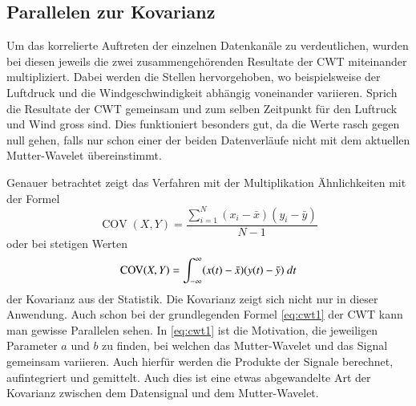 \begin{refsection}
\subsection{Parallelen zur Kovarianz}
Um das korrelierte Auftreten der einzelnen Datenkanäle zu verdeutlichen, wurden bei diesen jeweils die zwei zusammengehörenden Resultate der CWT miteinander multipliziert. 
Dabei werden die Stellen hervorgehoben, wo beispielsweise der Luftdruck und die Windgeschwindigkeit abhängig voneinander variieren. 
Sprich die Resultate der CWT gemeinsam und zum selben Zeitpunkt für den Luftruck und Wind gross sind.
Dies funktioniert besonders gut, da die Werte rasch gegen null gehen, falls nur schon einer der beiden Datenverläufe nicht mit dem aktuellen Mutter-Wavelet übereinstimmt.


Genauer betrachtet zeigt das Verfahren mit der Multiplikation Ähnlichkeiten mit der Formel
\begin{equation}
\operatorname{COV}(X,Y) = \frac{\sum_{i=1}^{N} (x_i- \bar{x})(y_i- \bar{y})}{N-1}
\label{eq:kovarianz}
\end{equation}
oder bei stetigen Werten
\begin{equation}
\operatorname{COV}(X,Y) = \int_{-\infty}^\infty (x(t)- \bar{x})(y(t)- \bar{y}) \text{\space}dt
\label{eq:kovarianz_int}
\end{equation}
der Kovarianz aus der Statistik. 
%
Die Kovarianz zeigt sich nicht nur in dieser Anwendung. Auch schon bei der grundlegenden Formel \eqref{eq:cwt1} der CWT kann man gewisse Parallelen sehen. 
In \eqref{eq:cwt1} ist die Motivation, die jeweiligen Parameter $a$ und $b$ zu finden, bei welchen das Mutter-Wavelet und das Signal gemeinsam variieren.
Auch hierfür werden die Produkte der Signale berechnet, aufintegriert und gemittelt.
Auch dies ist eine etwas abgewandelte Art der Kovarianz zwischen dem Datensignal und dem Mutter-Wavelet.


\end{refsection}
